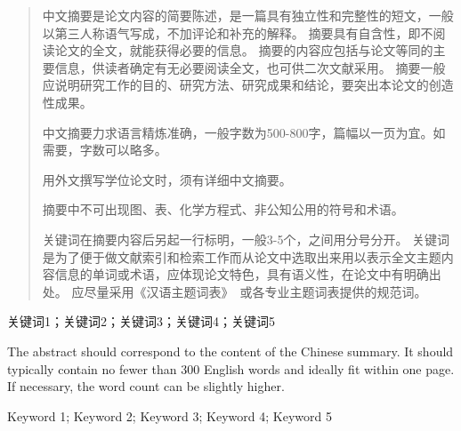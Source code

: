 \begin{abstract}
    中文摘要是论文内容的简要陈述，是一篇具有独立性和完整性的短文，一般以第三人称语气写成，不加评论和补充的解释。
    摘要具有自含性，即不阅读论文的全文，就能获得必要的信息。
    摘要的内容应包括与论文等同的主要信息，供读者确定有无必要阅读全文，也可供二次文献采用。
    摘要一般应说明研究工作的目的、研究方法、研究成果和结论，要突出本论文的创造性成果。

    中文摘要力求语言精炼准确，一般字数为500-800字，篇幅以一页为宜。如需要，字数可以略多。

    用外文撰写学位论文时，须有详细中文摘要。

    摘要中不可出现图、表、化学方程式、非公知公用的符号和术语。

    关键词在摘要内容后另起一行标明，一般3-5个，之间用分号分开。
    关键词是为了便于做文献索引和检索工作而从论文中选取出来用以表示全文主题内容信息的单词或术语，应体现论文特色，具有语义性，在论文中有明确出处。
    应尽量采用《汉语主题词表》~\cite{REF00000003}或各专业主题词表提供的规范词。
\end{abstract}

\begin{keywords}
    关键词1；关键词2；关键词3；关键词4；关键词5
\end{keywords}

\begin{enabstract}
    The abstract should correspond to the content of the Chinese summary.
    It should typically contain no fewer than 300 English words and ideally fit within one page.
    If necessary, the word count can be slightly higher.
\end{enabstract}

\begin{enkeywords}
    Keyword 1; Keyword 2; Keyword 3; Keyword 4; Keyword 5
\end{enkeywords}
